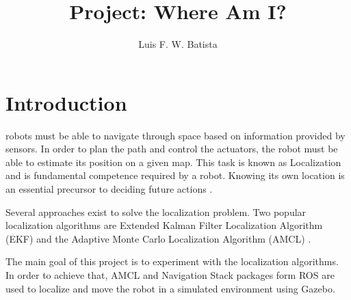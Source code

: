 \documentclass[10pt,journal,compsoc]{IEEEtran}
\begin{document}
\title{Project: Where Am I?}

\author{Luis F. W. Batista}

%
{}


\maketitle
\IEEEdisplaynontitleabstractindextext
\IEEEpeerreviewmaketitle
\section{Introduction}
\label{sec:introduction}

 robots must be able to navigate through space based on information provided by sensors. In order to plan the path and control the actuators, the robot must be able to estimate its position on a given map. This task is known as Localization and is fundamental competence required by a robot. Knowing its own location is an essential precursor to deciding future actions \cite{localization}. 

Several approaches exist to solve the localization problem. 
Two popular localization algorithms are Extended Kalman Filter Localization Algorithm (EKF) \cite{ekf} and the Adaptive Monte Carlo Localization Algorithm (AMCL) \cite{thrunpr}.

The main goal of this project is to experiment with the localization algorithms. In order to achieve that, AMCL and Navigation Stack packages form ROS are used to localize and move the robot in a simulated environment using Gazebo.
\end{document}
